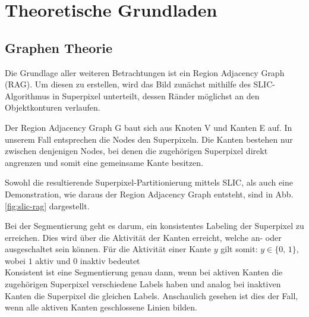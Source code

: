 \chapter{Theoretische Grundladen}\label{ch:theoretischeGrundlagen}
\section{Graphen Theorie}\label{sec:graphTheory}

Die Grundlage aller weiteren Betrachtungen ist ein Region Adjacency Graph (RAG). Um diesen zu erstellen, wird das Bild zunächst mithilfe des SLIC-Algorithmus \cite{slic} in Superpixel unterteilt, dessen Ränder möglichst an den Objektkonturen verlaufen. 

Der Region Adjacency Graph G baut sich aus Knoten V und Kanten E auf. In unserem Fall entsprechen die Nodes den Superpixeln. Die Kanten bestehen nur zwischen denjenigen Nodes, bei denen die zugehörigen Superpixel direkt angrenzen und somit eine gemeinsame Kante besitzen. 

Sowohl die resultierende Superpixel-Partitionierung mittels SLIC, als auch eine Demonstration, wie daraus der Region Adjacency Graph entsteht, sind in Abb. \ref{fig:slic-rag} dargestellt.

\begin{figure}[H]

	\centering
	\hfill
\end{figure}
\label{fig:slic-rag}

\vspace{0.5cm}


Bei der Segmentierung geht es darum, ein konsistentes Labeling der Superpixel zu erreichen. Dies wird über die Aktivität der Kanten erreicht, welche an- oder ausgeschaltet sein können. Für die Aktivität einer Kante $y$ gilt somit: $y \in \{\text{0, 1}\}$, wobei $1$ aktiv und 0 inaktiv bedeutet \\
Konsistent ist eine Segmentierung genau dann, wenn bei aktiven Kanten die zugehörigen Superpixel verschiedene Labels haben und analog bei inaktiven Kanten die Superpixel die gleichen Labels. Anschaulich gesehen ist dies der Fall, wenn alle aktiven Kanten geschlossene Linien bilden.


